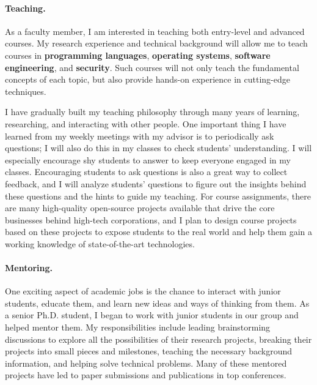 \documentclass[10pt]{article}
\begin{document}
\vspace{-0.12in}
\paragraph*{Teaching.}
As a faculty member, I am interested in teaching both entry-level and advanced courses. My research experience and technical background will allow me to teach courses in {\bf programming languages}, {\bf operating systems}, {\bf software engineering}, and {\bf security}. Such courses will not only teach the fundamental concepts of each topic, but also provide hands-on experience in cutting-edge techniques.

I have gradually built my teaching philosophy through many years of learning, researching, and interacting with other people. 
One important thing I have learned from my weekly meetings with my advisor is to periodically ask questions; 
I will also do this in my classes to check students' understanding. 
I will especially encourage shy students to answer to keep everyone engaged in my classes. 
Encouraging students to ask questions is also a great way to collect feedback, and I will analyze students' questions to figure out the insights behind these questions and
the hints to guide my teaching. 
For course assignments, there are many high-quality open-source projects
available that drive the core businesses behind high-tech corporations, and I plan to design course projects 
based on these projects to expose students to the real world and help them gain a working knowledge of state-of-the-art technologies.


\vspace{-0.12in}
\paragraph*{Mentoring.}
One exciting aspect of academic jobs is the chance to interact with junior students, educate them, and learn new ideas and ways of thinking from them. 
As a senior Ph.D. student, I began to work with junior students in
our group and helped mentor them. 
My responsibilities include leading brainstorming discussions to explore all
the possibilities of their research projects, breaking their projects into small pieces and milestones, 
teaching the necessary background information, and helping solve technical problems. 
Many of these mentored projects have
led to paper submissions and publications in top conferences.
\end{document}
